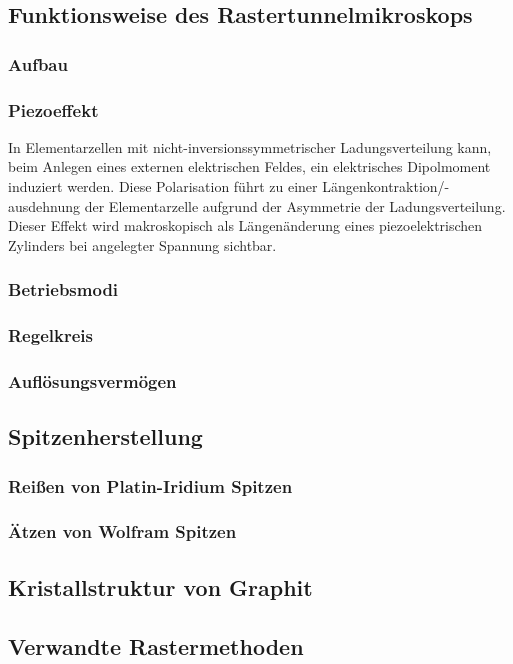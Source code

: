 \documentclass[10pt, a4paper]{article}
\begin{document}
\subsection{Funktionsweise des Rastertunnelmikroskops}
\subsubsection{Aufbau}
\subsubsection{Piezoeffekt}
In Elementarzellen mit nicht-inversionssymmetrischer Ladungsverteilung kann, beim Anlegen eines externen elektrischen Feldes, ein elektrisches Dipolmoment induziert werden.
Diese Polarisation führt zu einer Längenkontraktion/-ausdehnung der Elementarzelle aufgrund der Asymmetrie der Ladungsverteilung.
Dieser Effekt wird makroskopisch als Längenänderung eines piezoelektrischen Zylinders bei angelegter Spannung sichtbar.

\subsubsection{Betriebsmodi}
\subsubsection{Regelkreis}
\subsubsection{Auflösungsvermögen}

\subsection{Spitzenherstellung}
\subsubsection{Reißen von Platin-Iridium Spitzen}
\subsubsection{Ätzen von Wolfram Spitzen}

\subsection{Kristallstruktur von Graphit}

\subsection{Verwandte Rastermethoden}
\end{document}
